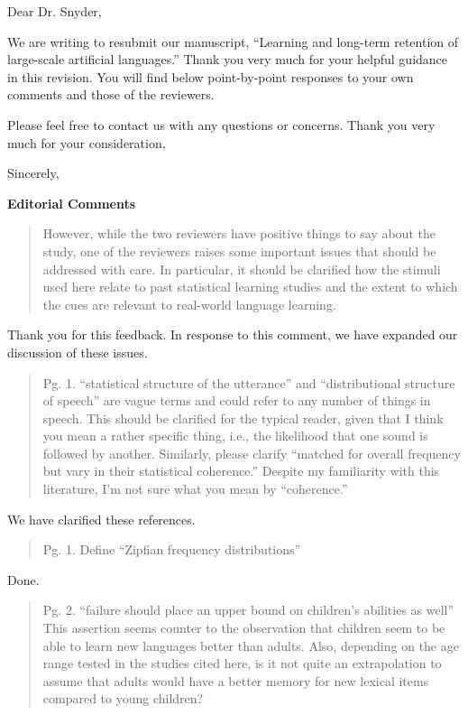 \documentclass[12pt]{letter}
\begin{document}
\begin{letter}

Dear Dr. Snyder,

We are writing to resubmit our manuscript, ``Learning and long-term retention of large-scale artificial languages.'' Thank you very much for your helpful guidance in this revision. You will find below point-by-point responses to your own comments and those of the reviewers.

Please feel free to contact us with any questions or concerns. Thank you very much for your consideration,

\closing{Sincerely,}

\end{letter}

\newpage

{\bf Editorial Comments}

\begin{quote}
However, while the two reviewers have positive things to say about the study, one of the reviewers raises some important issues that should be addressed with care. In particular, it should be clarified how the stimuli used here relate to past statistical learning studies and the extent to which the cues are relevant to real-world language learning. 
\end{quote}

Thank you for this feedback. In response to this comment, we have expanded our discussion of these issues. 

\begin{quote}
Pg. 1. ``statistical structure of the utterance'' and ``distributional structure of speech'' are vague terms and could refer to any number of things in speech. This should be clarified for the typical reader, given that I think you mean a rather specific thing, i.e., the likelihood that one sound is followed by another. Similarly, please clarify ``matched for overall frequency but vary in their statistical coherence.'' Despite my familiarity with this literature, I'm not sure what you mean by ``coherence.''
\end{quote}

We have clarified these references. 

\begin{quote}
Pg. 1. Define ``Zipfian frequency distributions''
\end{quote}

Done.

\begin{quote}
Pg. 2. ``failure should place an upper bound on children's abilities as well'' This assertion seems counter to the observation that children seem to be able to learn new languages better than adults. Also, depending on the age range tested in the studies cited here, is it not quite an extrapolation to assume that adults would have a better memory for new lexical items compared to young children?
\end{quote}
\end{document}
